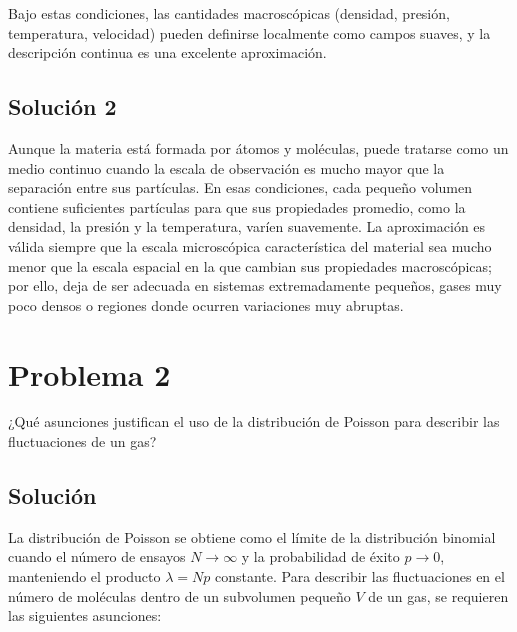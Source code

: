 \documentclass[a4paper]{article}
\begin{document}
Bajo estas condiciones, las cantidades macroscópicas (densidad, presión, temperatura, velocidad) pueden definirse localmente como campos suaves, y la descripción continua es una excelente aproximación.

\subsection{Solución 2}

Aunque la materia está formada por átomos y moléculas, puede tratarse como un medio continuo cuando la escala de observación es mucho mayor que la separación entre sus partículas. En esas condiciones, cada pequeño volumen contiene suficientes partículas para que sus propiedades promedio, como la densidad, la presión y la temperatura, varíen suavemente. La aproximación es válida siempre que la escala microscópica característica del material sea mucho menor que la escala espacial en la que cambian sus propiedades macroscópicas; por ello, deja de ser adecuada en sistemas extremadamente pequeños, gases muy poco densos o regiones donde ocurren variaciones muy abruptas.

\section{Problema 2}
¿Qué asunciones justifican el uso de la distribución de Poisson para describir las fluctuaciones de un gas?

\subsection{Solución}

La distribución de Poisson se obtiene como el límite de la distribución binomial cuando el número de ensayos $N \to \infty$ y la probabilidad de éxito $p \to 0$, manteniendo el producto $\lambda = Np$ constante. Para describir las fluctuaciones en el número de moléculas dentro de un subvolumen pequeño $V$ de un gas, se requieren las siguientes asunciones:
\end{document}

